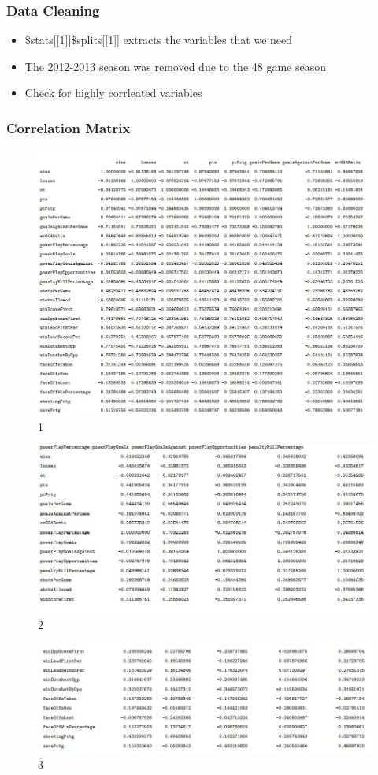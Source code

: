 \documentclass{beamer}
\begin{document}
\begin{frame}
	\frametitle{Data Cleaning}
	\begin{itemize}
	\item $\$$stats[[1]]$\$$splits[[1]] extracts the variables that we need
	\item The 2012-2013 season was removed due to the 48 game season
	\item Check for highly corrleated variables
	\end{itemize}
\end{frame}
\begin{frame}
	\frametitle{Correlation Matrix}
\begin{figure}
\centering
\includegraphics[width=0.7\linewidth]{"Correlation Matrix 1"}
\caption{1}
\label{fig:correlation-matrix-1}
\end{figure}
\end{frame}
\begin{frame}
\begin{figure}
	\centering
	\includegraphics[width=0.7\linewidth]{"Correlation Matrix 2"}
	\caption{2}
	\label{fig:correlation-matrix-2}
\end{figure}
\end{frame}
\begin{frame}
\begin{figure}
	\centering
	\includegraphics[width=0.7\linewidth]{"Correlation Matrix 3"}
	\caption{3}
	\label{fig:correlation-matrix-3}
\end{figure}
\end{frame}
\end{document}
